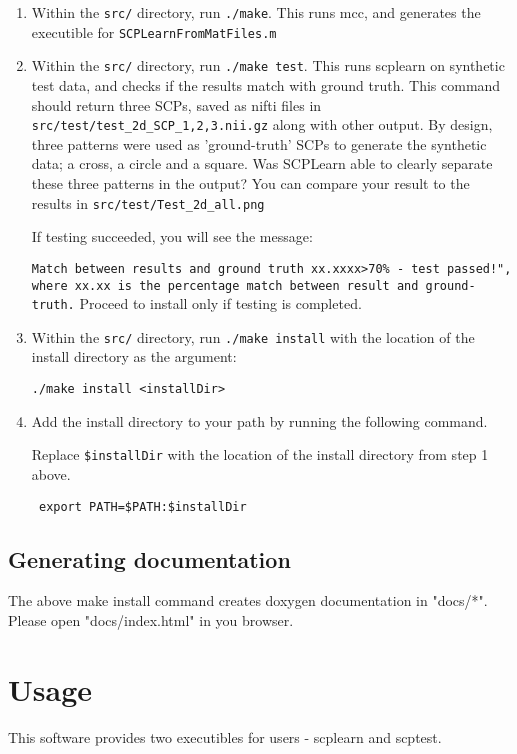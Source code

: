 \documentclass[12pt]{article}
\begin{document}
\begin{enumerate}
\item Within the \texttt{src/}  directory, run \texttt{./make}. This runs mcc, and generates the executible for \texttt{SCPLearnFromMatFiles.m}

\item Within the \texttt{src/}  directory, run \texttt{./make test}. This runs scplearn on synthetic test data, and checks if the results match with ground truth. This command should return three SCPs, saved as nifti files in \texttt{src/test/test\_2d\_SCP\_{1,2,3}.nii.gz} along with other output. By design, three patterns were used as 'ground-truth' SCPs to generate the synthetic data; a cross, a circle and a square. Was SCPLearn able to clearly separate these three patterns in the output? You can compare your result to the results in \texttt{src/test/Test\_2d\_all.png}

If testing succeeded, you will see the message: 

\texttt{Match between results and ground truth xx.xxxx>70\% - test passed!", where xx.xx is the percentage match between result and ground-truth.}
Proceed to install only if testing is completed.

\item Within the \texttt{src/}  directory, run \texttt{./make install}  with the location of the install directory as the argument:

\texttt{./make install <installDir>}

\item Add the install directory to your path by running the following command. 

Replace \texttt{\${installDir}} with the location of the install directory from step 1 above.

\texttt{ export PATH=\${PATH}:\${installDir} }

\end{enumerate}


\subsection{Generating documentation}

The above make install command creates doxygen documentation in "docs/*". Please open "docs/index.html" in you browser.

\section{Usage}
This software provides two executibles for users - scplearn and scptest.
\end{document}
